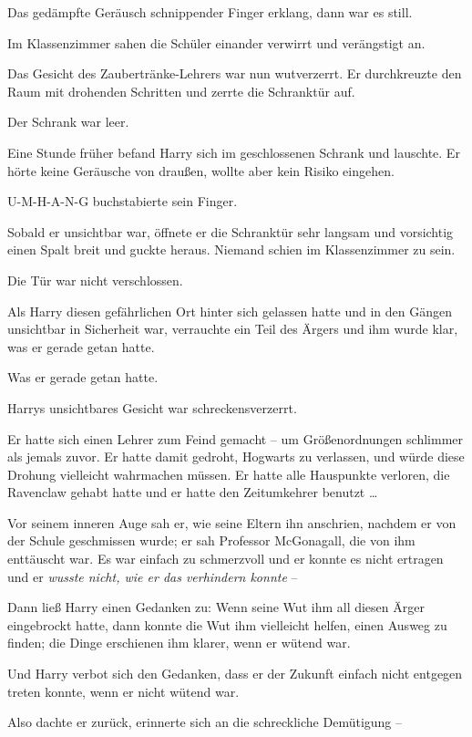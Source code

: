 {Das gedämpfte Geräusch schnippender Finger erklang, dann war es still.

Im Klassenzimmer sahen die Schüler einander verwirrt und verängstigt an.

Das Gesicht des Zaubertränke-Lehrers war nun wutverzerrt. Er durchkreuzte den Raum mit drohenden Schritten und zerrte die Schranktür auf.

Der Schrank war leer.

\later

Eine Stunde früher befand Harry sich im geschlossenen Schrank und lauschte. Er hörte keine Geräusche von draußen, wollte aber kein Risiko eingehen.

U-M-H-A-N-G buchstabierte sein Finger.

Sobald er unsichtbar war, öffnete er die Schranktür sehr langsam und vorsichtig einen Spalt breit und guckte heraus. Niemand schien im Klassenzimmer zu sein.

Die Tür war nicht verschlossen.

Als Harry diesen gefährlichen Ort hinter sich gelassen hatte und in den Gängen unsichtbar in Sicherheit war, verrauchte ein Teil des Ärgers und ihm wurde klar, was er gerade getan hatte.

Was er gerade getan hatte.

Harrys unsichtbares Gesicht war schreckensverzerrt.

Er hatte sich einen Lehrer zum Feind gemacht -- um Größenordnungen schlimmer als jemals zuvor. Er hatte damit gedroht, Hogwarts zu verlassen, und würde diese Drohung vielleicht wahrmachen müssen. Er hatte alle Hauspunkte verloren, die Ravenclaw gehabt hatte und er hatte den Zeitumkehrer benutzt …

Vor seinem inneren Auge sah er, wie seine Eltern ihn anschrien, nachdem er von der Schule geschmissen wurde; er sah Professor McGonagall, die von ihm enttäuscht war. Es war einfach zu schmerzvoll und er konnte es nicht ertragen und er \emph{wusste nicht, wie er das verhindern konnte} --

Dann ließ Harry einen Gedanken zu: Wenn seine Wut ihm all diesen Ärger eingebrockt hatte, dann konnte die Wut ihm vielleicht helfen, einen Ausweg zu finden; die Dinge erschienen ihm klarer, wenn er wütend war.

Und Harry verbot sich den Gedanken, dass er der Zukunft einfach nicht entgegen treten konnte, wenn er nicht wütend war.

Also dachte er zurück, erinnerte sich an die schreckliche Demütigung --

}
